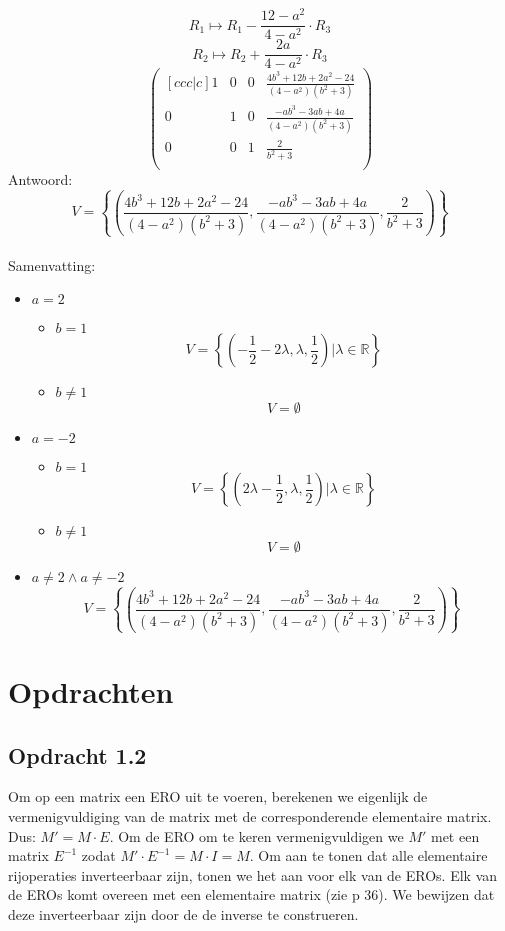 \documentclass[lineaire_algebra_oplossingen.tex]{subfiles}
\begin{document}
\[ R_1 \longmapsto R_1 - \frac{12-a^{2}}{4-a^{2}} \cdot R_3 \]
\[ R_2 \longmapsto R_2 + \frac{2a}{4-a^{2}} \cdot R_3 \]
\[
\begin{pmatrix}[ccc|c]
1 & 0 & 0 & \frac{4b^3+12b+2a^2-24}{(4-a^{2})(b^{2}+3)}\\
0 & 1 & 0 & \frac{-ab^{3}-3ab+4a}{(4-a^{2})(b^{2}+3)}\\
0 & 0 & 1 & \frac{2}{b^{2}+3}\\
\end{pmatrix}
\]
Antwoord:
\[
V = \left\lbrace\left(\frac{4b^3+12b+2a^2-24}{(4-a^{2})(b^{2}+3)},\frac{-ab^{3}-3ab+4a}{(4-a^{2})(b^{2}+3)},\frac{2}{b^{2}+3}\right)\right\rbrace
\]
\\Samenvatting:
\begin{itemize}
\item $a=2$
\begin{itemize}
\item $b=1$
\[
V = \left\lbrace \left(-\frac{1}{2}-2\lambda,\lambda,\frac{1}{2}\right)| \lambda \in \mathbb{R}\right\rbrace
\]
\item $b\neq 1$
\[
V = \emptyset
\]
\end{itemize}
\item $a=-2$
\begin{itemize}
\item $b=1$
\[
V= \left\lbrace \left(2\lambda-\frac{1}{2},\lambda,\frac{1}{2}\right)| \lambda \in \mathbb{R}\right\rbrace
\]
\item $b\neq 1$
\[
V= \emptyset
\]
\end{itemize}
\item $a\neq 2 \wedge a \neq -2$ 
\[
V = \left\lbrace\left(\frac{4b^3+12b+2a^2-24}{(4-a^{2})(b^{2}+3)},\frac{-ab^{3}-3ab+4a}{(4-a^{2})(b^{2}+3)},\frac{2}{b^{2}+3}\right)\right\rbrace
\]
\end{itemize}

\section{Opdrachten}
\subsection{Opdracht 1.2}
\label{1.2}
Om op een matrix een ERO uit te voeren, berekenen we eigenlijk de vermenigvuldiging van de matrix met de corresponderende elementaire matrix. Dus: $M' = M \cdot E$. Om de ERO om te keren vermenigvuldigen we $M'$ met een matrix $E^{-1}$ zodat $M'\cdot E^{-1} = M \cdot I = M$.
Om aan te tonen dat alle elementaire rijoperaties inverteerbaar zijn, tonen we het aan voor elk van de EROs. Elk van de EROs komt overeen met een elementaire matrix (zie p 36). We bewijzen dat deze inverteerbaar zijn door de de inverse te construeren.
\end{document}
